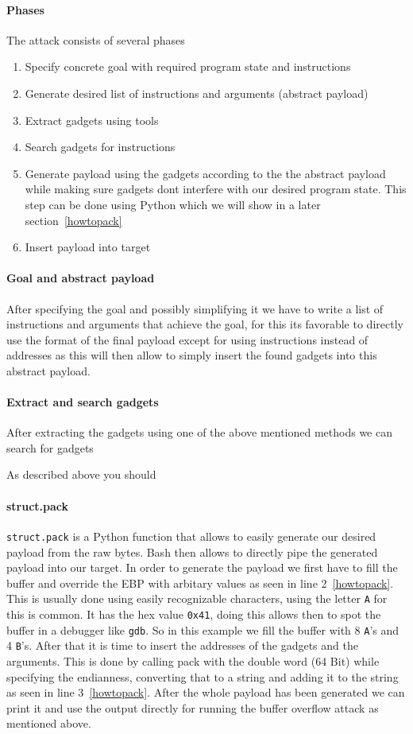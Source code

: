 \documentclass[journal=tosc,submission]{iacrtrans}
\begin{document}
\paragraph{Phases}
The attack consists of several phases
\begin{enumerate}
  \item Specify concrete goal with required program state and instructions
  \item Generate desired list of instructions and arguments (abstract payload)
  \item Extract gadgets using tools
  \item Search gadgets for instructions
  \item Generate payload using the gadgets according to the the abstract payload while making sure gadgets dont interfere with our desired program state. This step can be done using Python which we will show in a later section~\cref{howtopack}
  \item Insert payload into target
\end{enumerate}

\paragraph{Goal and abstract payload}
After specifying the goal and possibly simplifying it we have to write a list of instructions and arguments that achieve the goal, for this its favorable to directly use the format of the final payload except for using instructions instead of addresses as this will then allow to simply insert the found gadgets into this abstract payload.
\paragraph{Extract and search gadgets}
After extracting the gadgets using one of the above mentioned methods we can search for gadgets

As described above you should 

\paragraph{struct.pack}
\Verb+struct.pack+ is a Python function that allows to easily generate our desired payload from the raw bytes. Bash then allows to directly pipe the generated payload into our target. In order to generate the payload we first have to fill the buffer and override the EBP with arbitary values as seen in line 2~\cref{howtopack}. This is usually done using easily recognizable characters, using the letter \Verb+A+ for this is common. It has the hex value \Verb+0x41+, doing this allows then to spot the buffer in a debugger like \Verb+gdb+. So in this example we fill the buffer with 8 \Verb+A+'s and 4 \Verb+B+'s. After that it is time to insert the addresses of the gadgets and the arguments. This is done by calling pack with the double word (64 Bit) while specifying the endianness, converting that to a string and adding it to the string as seen in line 3~\cref{howtopack}. After the whole payload has been generated we can print it and use the output directly for running the buffer overflow attack as mentioned above.
\end{document}
